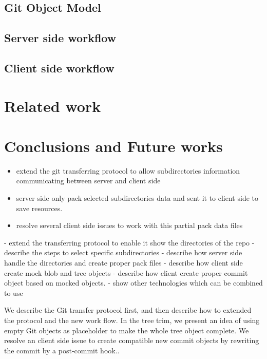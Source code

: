 \documentclass[preprint]{sigplanconf}
\begin{document}
\subsection{Git Object Model}
\subsection{Server side workflow}
\subsection{Client side workflow}

\section{Related work}

\section{Conclusions and Future works}


\begin{itemize}
  \item  extend the git transferring protocol to allow subdirectories information communicating between server and client side
  \item server side only pack selected subdirectories data and sent it to client side to save resources.
  \item resolve several client side issues to work with this partial pack data files
\end{itemize}

  - extend the transferring protocol to enable it show the directories of the repo
  - describe the steps to select specific subdirectories
  - describe how server side handle the directories and create proper pack files
  - describe how client side create mock blob and tree objects 
  - describe how client create proper commit object based on mocked objects.
- show other technologies which can be combined to use 

We describe the Git transfer protocol first, and then describe how to extended the protocol and the new work flow.
In the tree trim, we present an idea of using empty Git objects as placeholder to make the whole tree object complete.
We resolve an client side issue to create compatible new commit objects by rewriting the commit by a post-commit hook..
\end{document}
